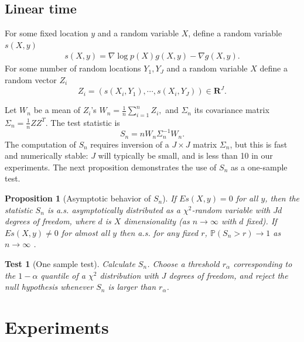 \documentclass{article}
\newtheorem{test}{Test}
\newtheorem{proposition}{Proposition}
\begin{document}
\subsection{Linear time}

For some fixed location $y$ and a random variable $X$, define a random variable $s(X,y)$
\begin{align}
 s(X,y) = \nabla \log p(X) g(X,y) -  \nabla g(X,y).
\end{align}
For some number of random locations $Y_1,Y_J$ and a random variable $X$ define a random vector $Z_i$
\begin{equation}
 Z_i = ( s(X_i,Y_1) , \cdots, s(X_i,Y_J)  )\in \mathbf R^J.
\end{equation}

Let $W_n$ be a mean of $Z_i$'s
$W_n = \frac 1  n \sum_{i=1}^n Z_i, $
and $\Sigma_n$ its  covariance matrix
$\Sigma_n = \frac 1  n Z Z^{T}$.
The test statistic is
\begin{equation}
 S_n = n W_n \Sigma_n^{-1} W_n.
\end{equation}
The computation of $S_n$ requires inversion of a $J\times J$ matrix $\Sigma_n$, but this is fast and numerically stable: $J$ will typically be small, and is less than 10 in our experiments. The next proposition demonstrates the use of $S_n$ as a one-sample test.
\begin{proposition}[Asymptotic behavior of $S_n$]
\label{prop:Hotelling}
 If  $E s(X,y)=0$ for all $y$, then the statistic $S_n$ is a.s. asymptotically distributed as a $\chi^2$-random variable with $Jd$ degrees of freedom, where $d$ is $X$ dimensionality (as $n \to \infty$ with $d$ fixed). If  $E s(X,y) \neq 0$ for almost all $y$ then a.s. for any fixed $r$, $\mathbb P(S_n > r) \to 1$  as $n \to \infty$ .
\end{proposition}


\begin{test}[One sample test]
\label{test}
Calculate $S_n$. Choose a threshold $r_\alpha$ corresponding to the $1-\alpha$ quantile of a  $\chi^2$ distribution with $J$ degrees of freedom, and reject the null hypothesis whenever $S_n$ is larger than $r_\alpha$. 
\end{test}

\section{Experiments}
\end{document}
